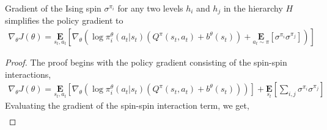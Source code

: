 \documentclass{article}
\begin{document}
\begin{prop}{4}\label{four}
    Gradient of the Ising spin $\sigma^{\pi_{i}}$ for any two levels $h_{i}$ and $h_{j}$ in the hierarchy $H$ simplifies the policy gradient to 
    \begin{gather}
        \nabla_{\theta}J(\theta) = \underset{s_{t},a_{t}}{\textbf{E}}[\nabla_{\theta}(\log \pi^{\theta}_{i}(a_{t}|s_{t})(Q^{\pi}(s_{t},a_{t}) + b^{\theta}(s_{t})) + \underset{a_{t} \sim \pi}{\textbf{E}}[\sigma^{\pi_{i}}\sigma^{\pi_{j}}])] \nonumber
    \end{gather}
\end{prop}
\begin{proof}
    The proof begins with the policy gradient consisting of the spin-spin interactions,
    \begin{gather}
        \nabla_{\theta}J(\theta) = \underset{s_{t},a_{t}}{\textbf{E}}[\nabla_{\theta}(\log \pi^{\theta}_{i}(a_{t}|s_{t})(Q^{\pi}(s_{t},a_{t}) + b^{\theta}(s_{t})))] + \underset{s_{t}}{\textbf{E}}[\sum_{i,j} \sigma^{\pi_{i}}\sigma^{\pi_{j}}] \nonumber
    \end{gather}
    Evaluating the gradient of the spin-spin interaction term, we get,
    \begin{gather}
        
    \end{gather}
\end{proof}


 

\end{document}
